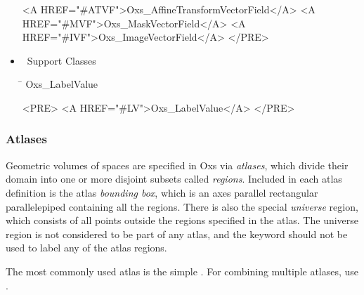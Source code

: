 \begin{itemize}
\begin{rawhtml}
   <A HREF="#ATVF">Oxs_AffineTransformVectorField</A> <A HREF="#MVF">Oxs_MaskVectorField</A>
   <A HREF="#IVF">Oxs_ImageVectorField</A>
</PRE>
  \end{rawhtml}
\item \MIF\ Support Classes
   {\tt\begin{tabbing}
   \hspace*{\tabcolwidth}\=\kill
      Oxs\_LabelValue
   \end{tabbing}}
  \begin{rawhtml}
<PRE>
   <A HREF="#LV">Oxs_LabelValue</A>
</PRE>
  \end{rawhtml}
\end{itemize}

\subsubsection{Atlases\label{sec:oxsAtlases}}
Geometric volumes of spaces are specified in Oxs via \textit{atlases},
which divide their domain into one or more disjoint subsets called
\textit{regions}.  Included in each atlas definition is the atlas
\textit{bounding box}, which is an axes parallel rectangular
parallelepiped containing all the regions.  There is also the special
\textit{universe} region, which consists of all points outside the
regions specified in the atlas.  The universe region is not considered
to be part of any atlas, and the  keyword should not be
used to label any of the atlas regions.

The most commonly used atlas is the simple .  For
combining multiple atlases, use .

